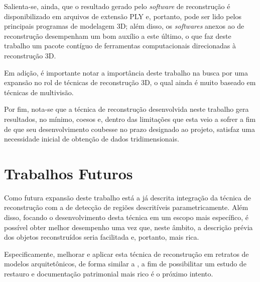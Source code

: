 			Salienta-se, ainda, que o resultado gerado pelo \textit{software} de reconstrução é disponibilizado em arquivos de extensão PLY e, portanto, pode ser lido pelos principais programas de modelagem 3D; além disso, os \textit{softwares} anexos ao de reconstrução desempenham um bom auxílio a este último, o que faz deste trabalho um pacote contíguo de ferramentas computacionais direcionadas à reconstrução 3D.
			
			Em adição, é importante notar a importância deste trabalho na busca por uma expansão no rol de técnicas de reconstrução 3D, o qual ainda é muito baseado em técnicas de multivisão. 
			
			Por fim, nota-se que a técnica de reconstrução desenvolvida neste trabalho gera resultados, no mínimo, coesos e, dentro das limitações que esta veio a sofrer a fim de que seu desenvolvimento coubesse no prazo designado ao projeto, satisfaz uma necessidade inicial de obtenção de dados tridimensionais.
			
		\section{Trabalhos Futuros}
			\label{secaoTrabalhosFuturos}
			
			Como futura expansão deste trabalho está a já descrita integração da técnica de reconstrução com a de detecção de regiões descritíveis parametricamente. Além disso, focando o desenvolvimento desta técnica em um escopo mais específico, é possível obter melhor desempenho uma vez que, neste âmbito, a descrição prévia dos objetos reconstruídos seria facilitada e, portanto, mais rica.
			
			Especificamente, melhorar e aplicar esta técnica de reconstrução em retratos de modelos arquitetônicos, de forma similar a \cite{3DFromLineDrawings}, a fim de possibilitar um estudo de restauro e documentação patrimonial mais rico é o próximo intento.